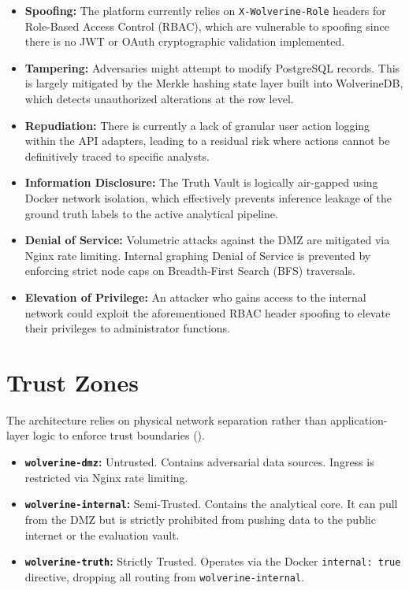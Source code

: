 \begin{itemize}
    \item \textbf{Spoofing:} The platform currently relies on \texttt{X-Wolverine-Role} headers for Role-Based 
          Access Control (RBAC), which are vulnerable to spoofing since there is no JWT or OAuth cryptographic 
          validation implemented.
    \item \textbf{Tampering:} Adversaries might attempt to modify PostgreSQL records. This is largely mitigated by 
          the Merkle hashing state layer built into WolverineDB, which detects unauthorized alterations at the row level.
    \item \textbf{Repudiation:} There is currently a lack of granular user action logging within the API adapters, 
          leading to a residual risk where actions cannot be definitively traced to specific analysts.
    \item \textbf{Information Disclosure:} The Truth Vault is logically air-gapped using Docker network isolation, 
          which effectively prevents inference leakage of the ground truth labels to the active analytical pipeline.
    \item \textbf{Denial of Service:} Volumetric attacks against the DMZ are mitigated via Nginx rate limiting. 
          Internal graphing Denial of Service is prevented by enforcing strict node caps on Breadth-First Search 
          (BFS) traversals.
    \item \textbf{Elevation of Privilege:} An attacker who gains access to the internal network could exploit the 
          aforementioned RBAC header spoofing to elevate their privileges to administrator functions.
\end{itemize}

\section{Trust Zones}
\label{sec:sec-trust-zones}
The architecture relies on physical network separation rather than application-layer logic to enforce trust 
boundaries ().
\begin{itemize}
    \item \textbf{\texttt{wolverine-dmz}:} Untrusted. Contains adversarial data sources. Ingress is restricted via 
          Nginx rate limiting.
    \item \textbf{\texttt{wolverine-internal}:} Semi-Trusted. Contains the analytical core. It can pull from the DMZ 
          but is strictly prohibited from pushing data to the public internet or the evaluation vault.
    \item \textbf{\texttt{wolverine-truth}:} Strictly Trusted. Operates via the Docker \texttt{internal: true} 
          directive, dropping all routing from \texttt{wolverine-internal}.
\end{itemize}

